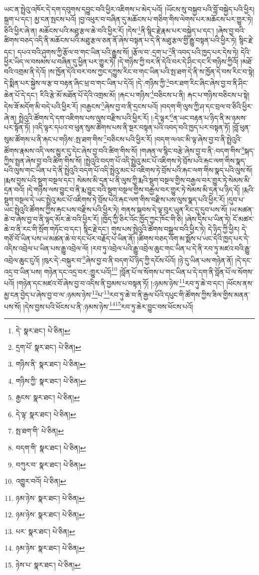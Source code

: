 ཡང་ན་སྤྲེའུ་འཁོར་དེ་དག་དབུགས་དབྱུང་བའི་ཕྱིར་འཇིགས་པ་མེད་པའོ། །ཡོངས་སུ་བསྐྱབ་པའི་བློ་བསྐྱེད་པའི་ཕྱིར། སྐྲག་པ་དང་། མྱ་ངན་སྤངས་པའོ། །བྱ་འཕུར་བ་བཞིན་དུ་མཆོངས་པ་གཅིག་གིས་ལེགས་པར་མཆོངས་པར་གྱུར་ཏེ། ཅིའི་ཕྱིར་ཞེ་ན། མཆོངས་པའི་མཐུ་རྩལ་ཆེ་བའི་ཕྱིར་རོ། །དེས་\footnote{དེ་  སྣར་ཐང་།  པེ་ཅིན། }ནི་སྙིང་རྗེ་རྣམ་པར་བསྐྱེད་པ་དང་། །ཞེས་བྱ་བའི་ཚིགས་བཅད་འདི་ནི་མཆོངས་པའི་མཐུ་རྩལ་ཅན་ནོ་ཞེས་བསྟན་པ་དེ་ནི་མཐུ་རྩལ་གྱི་རྒྱུ་བསྟན་པའི་ཕྱིར་ཏེ། སྙིང་རྗེ་དང་། དཔའ་བའི་ཤུགས་ཀྱི་རྩོལ་བ་གང་ཡིན་པའི་རྒྱུས་སོ། །རྩོལ་བ་:དྲག་པ་\footnote{དྲག་པོ་  སྣར་ཐང་།  པེ་ཅིན། }ནི་འབད་པའི་ཁྱད་པར་དེས་ཏེ། དེའི་ཕྱིར་ཡིད་ལ་བསམས་པ་བཞིན་དུ་ཕྱིན་པར་གྱུར་ཏོ། །དེ་གཉིས་ཀྱི་བར་ནི་དེའི་བར་དེ་ཤིང་དང་རི་གཉིས་ཀྱིའོ། །མཐོ་བའི་འགྲམ་ནི་དེའོ། །ས་ཁྱོན་དེའི་བར་བས་ཀྱང་དཀྱུས་རིང་བ་གང་ཡིན་པའི་སྤ་ཐག་དེ་ནི་ས་ཁྱོན་དེ་བས་རིང་བ་སྟེ། དེ་སྨིན་པར་སྐྱེས་ལ་རྩ་བ་བརྟན་ཞིང་ཕྲ་བ་གང་ཡིན་པ་དེའོ། །དེ་:གཉིས་ཀྱི་\footnote{གཉིས་ནི་  སྣར་ཐང་།  པེ་ཅིན། }བར་ཐག་རིང་ཞིང་ཞེས་བྱ་བ་ནི་ཤིང་ཆེན་པོ་དེ་དང་། རིའི་རྩེ་མོ་མཐོན་པོ་དེའི་འགྲམ་མོ། །རྐང་པ་གཉིས་\footnote{གཉིས་ཀྱི་  སྣར་ཐང་།  པེ་ཅིན། }བཅིངས་པ་ནི། རྐང་པ་གཉིས་བཅིངས་པ་སྟེ། དེས་ཟོ་མདོག་མི་བདེ་པའི་ཕྱིར་རོ། །བརྒྱངས་\footnote{རྒྱངས་  སྣར་ཐང་།  པེ་ཅིན། }ཞེས་བྱ་བ་ནི་དྲངས་པའོ། །བདག་གི་ལུས་ཀྱི་ཤ་དང་བྲལ་བ་ཅིའི་ཕྱིར་ཞེ་ན། སྤྲེའུའི་ཚོགས་དེ་དག་འཇིགས་པས་ལུས་བརྫིས་པའི་ཕྱིར་རོ། །:དེ་ལྟར་\footnote{དེ་ལྟ་  སྣར་ཐང་།  པེ་ཅིན། }ན་ཡང་བརྟན་པ་ཉིད་ནི་མ་ཉམས་པར་སྟོན་ཏོ། །འདི་ལྟར་དཔའ་བ་ཕུན་སུམ་ཚོགས་པས་ནི་སྔར་བསྟན་པའི་འབད་བའི་ཁྱད་པར་བསྟན་ཏོ། །བློ་ཕུན་སུམ་ཚོགས་པ་ནི་རྐང་པ་གཉིས་:སྤ་ཐག་གིས་\footnote{སྤ་ཐག་གི་  པེ་ཅིན། }བཅིངས་པའི་ཕྱིར་རོ། །བདག་ལའང་མི་ལྟ་ཞེས་བྱ་བ་ནི་སྤྲེའུའི་ཚོགས་རྣམས་འདི་ལས་མྱུར་དུ་དེང་ཞེས་བྱ་བའི་ཚིག་གིས་སོ། །གཞན་ལ་སྙིང་བརྩེ་ཞེས་བྱ་བ་ནི་:བདག་གིས་\footnote{བདག་གི་  སྣར་ཐང་།  པེ་ཅིན། }སྐད་ཀྱིས་སྤྲན་ཞེས་བྱ་བའི་ཚིག་གིས་སོ། །སྤྲེའུའི་བདག་པོ་འདི་སྤྲེའུ་མང་པོ་འཇིགས་ཏེ་བྲོས་པའི་རྐང་ལག་གིས་སྣད་པའི་ལུས་གང་ཡིན་པ་དེ་ནི་སྤྲེའུའི་བདག་པོ་འདི་སྤྲེའུ་མང་པོ་འཇིགས་ཏེ་བྲོས་པའི་རྐང་ལག་གིས་སྣད་པའི་ལུས་སོ། །རྨས་བྱས་པའི་སྡུག་བསྔལ་དང་། སེམས་མི་དྲན་པ་ནི་ལུས་ཀྱི་རྨའི་སྡུག་བསྔལ་གྱིས་བརྒྱལ་བར་གྱུར་ཏེ་སེམས་མི་དྲན་བའོ། །དེ་གཉིས་ལས་བྱུང་བ་ནི་རྨ་བྱུང་བའི་སྡུག་བསྔལ་གྱིས་བརྒྱལ་བར་གྱུར་ཏེ་སེམས་མི་དྲན་པ་ཉིད་དོ། །རྨའི་སྡུག་བསྔལ་དེ་ཡང་སྤྲེའུ་མང་པོ་འཇིགས་ཏེ་བྲོས་པའི་རྐང་ལག་གིས་བརྫིས་པས་ལུས་སྣད་པའི་ཕྱིར་རོ། །དུབ་པ་ཡང་སྤྲེའུའི་ཚོགས་ཀྱིས་རྐང་པས་བརྫིས་པའི་ཕྱིར་ཏེ། གནས་སྐབས་དེ་ལྟ་བུར་ཡུན་རིང་དུ་དུབ་པས་སོ། །ཡ་མཚན་ཆེ་བ་ཞེས་བྱ་བ་ནི་ལྟད་མོར་ཆེ་བའི་ཕྱིར་རོ། །ཁྱོད་ཀྱི་ཅིར་འོང་ཁྱོད་ཀྱང་ཁོང་གི་ཅི། །ཞེས་དྲིས་པ་ཡིན་ཏེ། ངོ་མཚར་ཆེ་བ་ནི་རང་གི་སྲོག་གཏོང་བ་དང་། སྙིང་རྗེ་དང་། གུས་པས་སྤྲེའུའི་ཚོགས་བསྒྲལ་བའི་ཕྱིར་ཏེ། དེ་ཉིད་ཀྱི་ཕྱིར། དེ་གཙོ་བོ་ཡིན་པས་ཡ་མཚན་ཆེ་བ་དང་པོར་བརྗོད་པ་ཡིན་ནོ། །ཚིགས་བཅད་འོག་མ་སྨོས་པ་ཡང་དེའི་ཁྱད་པར་དེ་འདིས་འབྲེལ་པ་ཡིན་པས་རྒྱུ་འབྲེལ་ལོ། །རབ་ཏུ་འབྲེལ་པའི་རྒྱུ་འབྲེལ་ཆུང་གང་ཡིན་པ་དེ་ནི་རབ་ཏུ་མཛའ་བའི་རྒྱུ་འབྲེལ་ཆུང་ངུའོ། །ཁུར་དེ་:བསྐུར་བ་\footnote{བཀུར་བ་  སྣར་ཐང་།  པེ་ཅིན། }ཞེས་བྱ་བ་ནི་བདག་པོ་ཉིད་ཀྱི་དངོས་པོའོ། །ཉེ་དུ་ཡིན་པས་གཉེན་ནོ། །དེ་དང་འདྲ་བ་ཡིན་པས། གཉེན་དང་འདྲ་བར་:གྱུར་པའོ།\footnote{འགྱུར་བའོ།  པེ་ཅིན། } །བློན་པོ་ལ་སོགས་པ་གང་ཡིན་པ་དེ་དག་ནི་བློན་པོ་ལ་སོགས་པའོ། །གཉེན་དང་མཛའ་བོ་ཞེས་བྱ་བ་འདིས་ནི་བྱམས་པ་བསྟན་ཏོ། །:ཉམས་ཉེས་\footnote{ཉམ་ཉེས་  སྣར་ཐང་།  པེ་ཅིན། }རབ་ཏུ་ཆེ་བ་དང་། །ཕོངས་ནས་མྱ་ངན་བྱེད་པ་ཞེས་བྱ་བ་ལ་:ཉམས་ཉེས་\footnote{ཉམ་ཉེས་  སྣར་ཐང་།  པེ་ཅིན། }པ་\footnote{པར་  སྣར་ཐང་།  པེ་ཅིན། }རབ་ཏུ་ཆེ་བ་ནི་རྒྱལ་པོའི་དཔུང་གི་ཚོགས་ཀྱིས་ཟིལ་གྱིས་མནན་པས་སོ། །དེས་བྱས་པའི་ཕོངས་པ་ནི་:ཉམས་ཉེས་\footnote{ཉམ་ཉེས་  སྣར་ཐང་།  པེ་ཅིན། }\footnote{ཉེས་པ་  སྣར་ཐང་།  པེ་ཅིན། }རབ་ཏུ་ཆེར་བྱུང་བས་ཕོངས་པའོ། 
